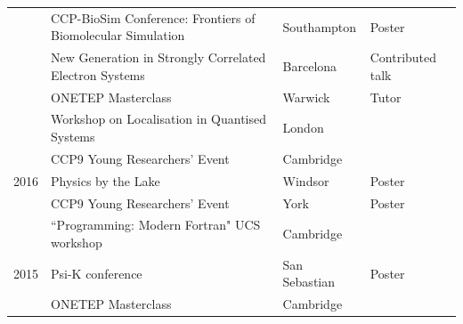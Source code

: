 \documentclass[10pt,a4paper,final]{article}
\begin{document}
\begin{tabularx}{\textwidth}{
      m{}%
      m{}%
      m{}%
      m{}}
                 & CCP-BioSim Conference: Frontiers of Biomolecular Simulation & Southampton       & Poster                \\
                 & New Generation in Strongly Correlated Electron Systems      & Barcelona         & Contributed talk      \\
                 & ONETEP Masterclass                                          & Warwick           & Tutor                 \\
                 & Workshop on Localisation in Quantised Systems               & London            &                       \\
                 & CCP9 Young Researchers' Event                               & Cambridge         &                       \\
   {2016}        & Physics by the Lake                                         & Windsor           & Poster                \\
                 & CCP9 Young Researchers' Event                               & York              & Poster                \\
                 & ``Programming: Modern Fortran" UCS workshop                 & Cambridge         &                       \\
   {2015}        & Psi-K conference                                            & San Sebastian     & Poster                \\
                 & ONETEP Masterclass                                          & Cambridge         &
\end{tabularx}
%
\end{document}
